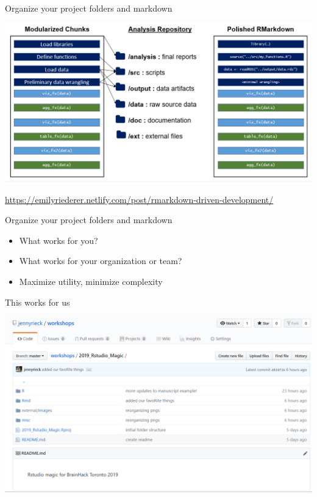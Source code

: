 \documentclass[
  ignorenonframetext,
]{beamer}
\providecommand{\tightlist}{%
  \setlength{\itemsep}{0pt}\setlength{\parskip}{0pt}}
\begin{document}
\begin{frame}{Organize your project folders and markdown}
\protect\hypertarget{organize-your-project-folders-and-markdown}{}

\includegraphics{../external/images/setup_4_markdown_project.PNG}

\url{https://emilyriederer.netlify.com/post/rmarkdown-driven-development/}

\end{frame}

\begin{frame}{Organize your project folders and markdown}
\protect\hypertarget{organize-your-project-folders-and-markdown-1}{}

\begin{itemize}
\tightlist
\item
  What works for you?
\item
  What works for your organization or team?
\item
  Maximize utility, minimize complexity
\end{itemize}

\end{frame}

\begin{frame}{This works for us}
\protect\hypertarget{this-works-for-us}{}

\includegraphics{../external/images/setup_5_git.PNG}

\end{frame}
\end{document}
